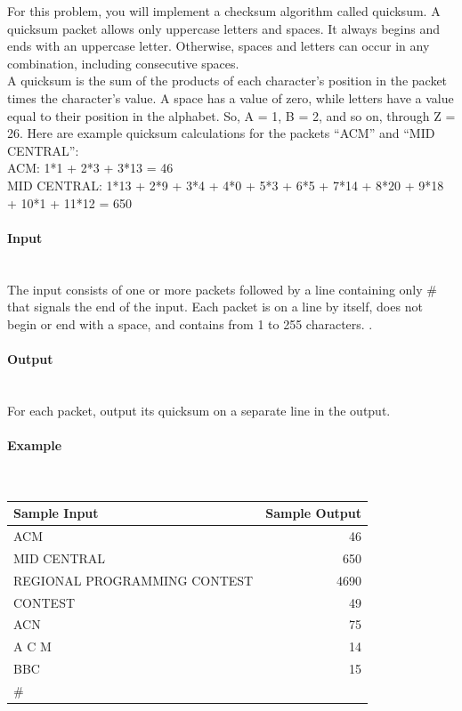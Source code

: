 \documentclass{article}
\begin{document}
For this problem, you will implement a checksum algorithm called quicksum. A quicksum packet allows only uppercase letters and spaces. It always begins and ends with an uppercase letter. Otherwise, spaces and letters can occur in any combination, including consecutive spaces. \\

A quicksum is the sum of the products of each character’s position in the packet times the character’s value. A space has a value of zero, while letters have a value equal to their position in the alphabet. So, A = 1, B = 2, and so on, through Z = 26. Here are example quicksum calculations
for the packets “ACM” and “MID CENTRAL”: \\

ACM: 1*1 + 2*3 + 3*13 = 46 \\

MID CENTRAL: 1*13 + 2*9 + 3*4 + 4*0 + 5*3 + 6*5 + 7*14 + 8*20 + 9*18 + 10*1 + 11*12 = 650

\paragraph{Input} \mbox{} \\

The input consists of one or more packets followed by a line containing only \# that signals the end of the input. Each packet is on a line by itself, does not begin or end with a space, and contains from 1 to 255 characters.
.

\paragraph{Output}\mbox{} \\

For each packet, output its quicksum on a separate line in the output.

\paragraph{Example}\mbox{} \\

\begin{table}[h]
    \centering
    \begin{tabular}{|l|r|}
        \hline
        \textbf{Sample Input} & \textbf{Sample Output} \\
        \hline
        ACM   &  46  \\ 
        MID CENTRAL  & 650 \\ 
        REGIONAL PROGRAMMING CONTEST & 4690 \\ 
        CONTEST    & 49 \\ 
        ACN    &  75 \\ 
        A C M    &  14\\ 
        BBC     &   15  \\
        $\#$& \\ \hline
    \end{tabular}
\end{table}
\end{document}
